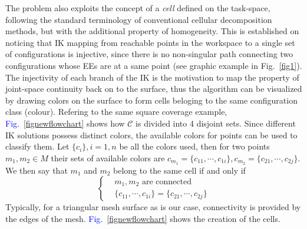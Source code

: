 \documentclass[journal]{IEEEtran}
\begin{document}
The problem also exploits the concept of a \textit{cell} defined on the task-space, following the standard terminology 
of conventional cellular decomposition methods, but with the additional property of homogeneity. 
This is established on noticing that IK mapping from reachable points in the workspace to a single set of configurations is injective, since there is no non-singular path connecting two configurations whose EEs are at a same point 
(see graphic example in Fig.~\ref{fig1}). 
The injectivity of each branch of the IK is the motivation to map the property of joint-space continuity back on to the surface, thus the algorithm can be visualized by drawing colors on the surface to form cells beloging to the same configuration class (colour).  
Refering to the same square coverage example, 
\textcolor{blue}{Fig.~\ref{fignewflowchart} }
shows how $\mathscr{C}$ is divided into 4 disjoint sets. 
Since different IK solutions possess distinct colors, the available colors for points can be used to classify them. Let $\{c_i\}, i = 1, n$ be all the colors used, then for two points $m_1, m_2\in M$ their sets of available colors are $c_{m_1} = \{c_{11}, \cdots, c_{1i}\}, c_{m_2} = \{c_{21}, \cdots, c_{2j}\}$. We then say that $m_1$ and $m_2$ belong to the same cell if and only if 
$$\left\{
\begin{aligned}
& m_1,m_2 \mbox{ are connected}\\ %
& \{c_{11}, \cdots, c_{1i}\} = \{c_{21}, \cdots, c_{2j}\}
\end{aligned}
\right.
$$
Typically, for a triangular mesh surface as is our case, connectivity is provided by the edges of the mesh. 
\textcolor{blue}{Fig.~\ref{fignewflowchart} }
shows the creation of the cells. 
\end{document}
